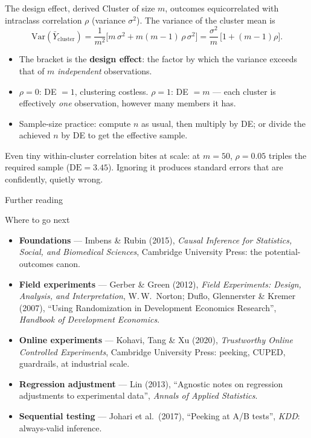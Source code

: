 \documentclass[aspectratio=169,11pt]{beamer}
\begin{document}
\begin{frame}{The design effect, derived}
  Cluster of size $m$, outcomes equicorrelated with intraclass correlation $\rho$
  (variance $\sigma^2$). The variance of the cluster mean is
  \[
    \mathrm{Var}(\bar Y_{\text{cluster}})
      = \frac{1}{m^2}\Big[m\,\sigma^2 + m(m-1)\,\rho\,\sigma^2\Big]
      = \frac{\sigma^2}{m}\,\big[1 + (m-1)\rho\big] .
  \]
  \begin{readme}
    \begin{itemize}
      \item The bracket is the \textbf{design effect}: the factor by which the variance
            exceeds that of $m$ \emph{independent} observations.
      \item $\rho=0$: DE $=1$, clustering costless. $\rho=1$: DE $=m$ --- each cluster
            is effectively \emph{one} observation, however many members it has.
      \item Sample-size practice: compute $n$ as usual, then multiply by DE; or divide
            the achieved $n$ by DE to get the effective sample.
    \end{itemize}
  \end{readme}
  \begin{takeaway}
    Even tiny within-cluster correlation bites at scale: at $m=50$, $\rho=0.05$ triples
    the required sample ($\mathrm{DE}=3.45$). Ignoring it produces standard errors that
    are confidently, quietly wrong.
  \end{takeaway}
\end{frame}

\begin{frame}{Further reading}
  \footnotesize
  \begin{block}{Where to go next}
    \begin{itemize}
      \item \textbf{Foundations} --- Imbens \& Rubin (2015), \emph{Causal Inference for
            Statistics, Social, and Biomedical Sciences}, Cambridge University Press:
            the potential-outcomes canon.
      \item \textbf{Field experiments} --- Gerber \& Green (2012), \emph{Field
            Experiments: Design, Analysis, and Interpretation}, W.\,W.\ Norton;
            Duflo, Glennerster \& Kremer (2007), ``Using Randomization in Development
            Economics Research'', \emph{Handbook of Development Economics}.
      \item \textbf{Online experiments} --- Kohavi, Tang \& Xu (2020), \emph{Trustworthy
            Online Controlled Experiments}, Cambridge University Press: peeking, CUPED,
            guardrails, at industrial scale.
      \item \textbf{Regression adjustment} --- Lin (2013), ``Agnostic notes on regression
            adjustments to experimental data'', \emph{Annals of Applied Statistics}.
      \item \textbf{Sequential testing} --- Johari et al.\ (2017), ``Peeking at A/B
            tests'', \emph{KDD}: always-valid inference.
    \end{itemize}
  \end{block}
\end{frame}
\end{document}
